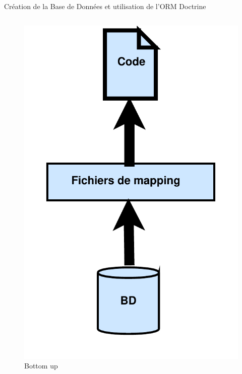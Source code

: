 \begin{frame}
\begin{block}{Création de la Base de Données et utilisation de l'ORM Doctrine}
\begin{columns}
			\begin{column}{4cm}
			\begin{figure}[!h]
				\begin{center}
					\includegraphics[scale=0.225]{images/bottomUp}
					\caption{Bottom up}
				\end{center}
			\end{figure}
		\end{column}
	
	\end{columns}
	\end{block} 
\end{frame}




